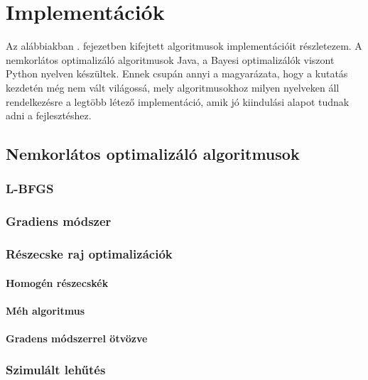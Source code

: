 \chapter{Implementációk}
\label{sec:implementaciok}
Az alábbiakban . fejezetben kifejtett algoritmusok implementációit részletezem. A nemkorlátos optimalizáló algoritmusok Java, a Bayesi optimalizálók viszont Python nyelven készültek. Ennek csupán annyi a magyarázata, hogy a kutatás kezdetén még nem vált világossá, mely algoritmusokhoz milyen nyelveken áll rendelkezésre a legtöbb létező implementáció, amik jó kiindulási alapot tudnak adni a fejlesztéshez.

\section{Nemkorlátos optimalizáló algoritmusok}
\subsection{L-BFGS}
\subsection{Gradiens módszer}
\subsection{Részecske raj optimalizációk}
\subsubsection{Homogén részecskék}
\subsubsection{Méh algoritmus}
\subsubsection{Gradens módszerrel ötvözve}
\subsection{Szimulált lehűtés}

